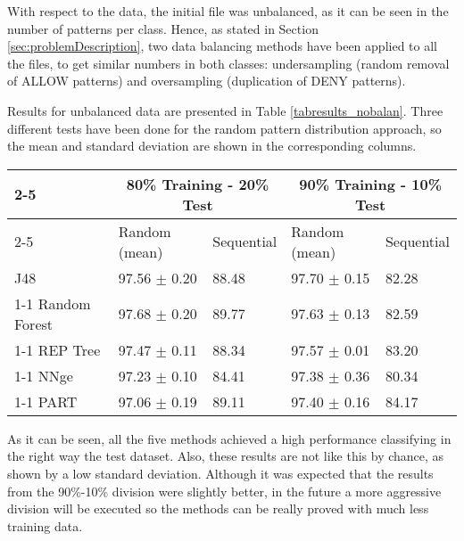 \documentclass{llncs}
\begin{document}
With respect to the data, the initial file was unbalanced, as it can be seen in the number of patterns per class. Hence, as stated in Section \ref{sec:problemDescription}, two data balancing methods have been applied to all the files, to get similar numbers in both classes: undersampling (random removal of ALLOW patterns) and oversampling (duplication of DENY patterns).

Results for unbalanced data are presented in Table \ref{tabresults_nobalan}.
Three different tests have been done for the random pattern distribution approach, so the mean and standard deviation are shown in the corresponding columns.

\begin{table*}[htpb]
\centering
 \caption{\label{tabresults_nobalan} Percentage of correctly classified patterns for non-balanced data}
{\small
\begin{tabular}{|l|l|l|l|l|}
\cline{2-5}
\multicolumn{1}{l|}{} & \multicolumn{2}{c|}{80\% Training - 20\% Test} & \multicolumn{2}{c|}{90\% Training - 10\% Test} \\ 
\cline{2-5}
\multicolumn{1}{l|}{} & Random (mean) & Sequential & Random (mean) & Sequential \\ 
\hline
J48 & 97.56 $\pm$ 0.20 & 88.48 & 97.70 $\pm$ 0.15 & 82.28 \\ 
\cline{1-1}
Random Forest & 97.68 $\pm$ 0.20 & 89.77 & 97.63 $\pm$ 0.13 & 82.59 \\ 
\cline{1-1}
REP Tree & 97.47 $\pm$ 0.11 & 88.34 & 97.57 $\pm$ 0.01 & 83.20 \\ 
\cline{1-1}
NNge & 97.23 $\pm$ 0.10 & 84.41 & 97.38 $\pm$ 0.36 & 80.34 \\ 
\cline{1-1}
PART & 97.06 $\pm$ 0.19 & 89.11 & 97.40 $\pm$ 0.16 & 84.17 \\ 
\hline
\end{tabular}
}
\end{table*}
 
As it can be seen, all the five methods achieved a high performance classifying in the right way the test dataset. Also, these results are not like this by chance, as shown by a low standard deviation. Although it was expected that the results from the 90\%-10\% division were slightly better, in the future a more aggressive division will be executed so the methods can be really proved with much less training data.
\end{document}
